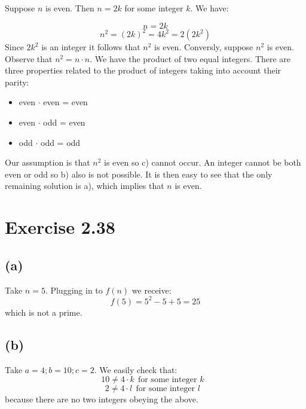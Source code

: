\documentclass{article}
\begin{document}
Suppose \(n\) is even. Then \(n=2k\) for some integer \(k\). We have:

\begin{equation*}
	n = 2k
\end{equation*}
\begin{equation*}
	n^2 = (2k)^2 = 4k^2 = 2(2k^2)
\end{equation*}
Since \(2k^2\) is an integer it follows that \(n^2\) is even. Conversly, suppose \(n^2\) is even. Observe that \(n^2 = n \cdot n\). We have
the product of two equal integers. There are three properties related to the
product of integers taking into account their parity:

\begin{itemize}
	\item[a)]  even \(\cdot\) even = even  

	\item[b)] even \(\cdot\) odd = even 
		
	\item[c)] odd \(\cdot\) odd  = odd   
\end{itemize}

Our assumption is that \(n^2\) is even so c) cannot occur. An integer cannot be
both even or odd so b) also is not possible. It is then easy to see that the
only remaining solution is a), which implies that \(n\) is even. 

\section*{Exercise 2.38}

\subsection*{(a)}
Take \(n = 5\). Plugging in to \(f(n)\) we receive:
\begin{equation*}
	f(5) = 5^2 - 5 + 5 = 25
\end{equation*}
which is not a prime.
\subsection*{(b)}
Take \(a = 4; b=10; c=2\). We easily check that:
\begin{equation*}
	10 \neq 4 \cdot k \ \ \mbox{for some integer \(k\) }
\end{equation*}
\begin{equation*}
	2 \neq 4 \cdot l \ \ \mbox{for some integer \(l\) }
\end{equation*}
because there are no two integers obeying the above.
\end{document}

